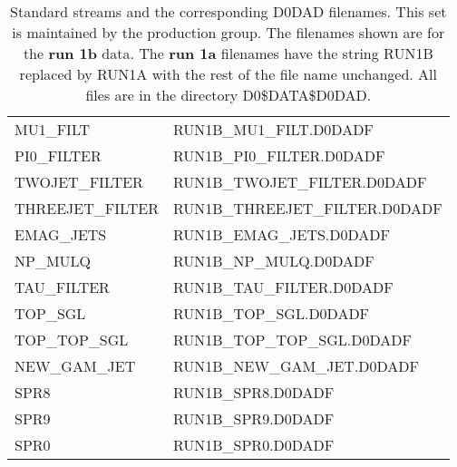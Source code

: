 {\begin{table}
\begin{center}
\begin{tabular}{|l|l|}
      MU1\_FILT 	& RUN1B\_MU1\_FILT.D0DADF \\
      PI0\_FILTER 	& RUN1B\_PI0\_FILTER.D0DADF \\
      TWOJET\_FILTER 	& RUN1B\_TWOJET\_FILTER.D0DADF \\
      THREEJET\_FILTER 	& RUN1B\_THREEJET\_FILTER.D0DADF \\
      EMAG\_JETS 	& RUN1B\_EMAG\_JETS.D0DADF \\
      NP\_MULQ          & RUN1B\_NP\_MULQ.D0DADF \\
      TAU\_FILTER       & RUN1B\_TAU\_FILTER.D0DADF \\
      TOP\_SGL          & RUN1B\_TOP\_SGL.D0DADF \\
      TOP\_TOP\_SGL     & RUN1B\_TOP\_TOP\_SGL.D0DADF \\
      NEW\_GAM\_JET     & RUN1B\_NEW\_GAM\_JET.D0DADF \\
      SPR8              & RUN1B\_SPR8.D0DADF \\
      SPR9              & RUN1B\_SPR9.D0DADF \\
      SPR0              & RUN1B\_SPR0.D0DADF \\
   \hline
  \end{tabular}
  \caption{Standard streams and the corresponding D0DAD filenames.  This set
     is maintained by the production group.  The filenames shown are
     for the {\bf run 1b} data. The {\bf run 1a} filenames have 
     the string RUN1B replaced by RUN1A with the rest of the file name 
     unchanged.  
     All files are in the directory D0\$DATA\$D0DAD. \label{t-stand}}
  \end{center}
\end{table}  }%

